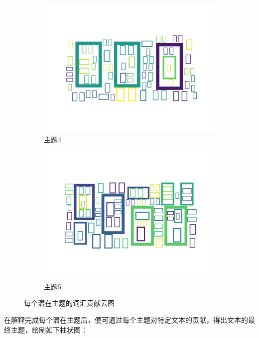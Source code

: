 \documentclass[UTF8,a4paper,15pt,titlepage,oneside]{ctexbook}
\begin{document}
\begin{figure}[htbp]
    \begin{subfigure}{0.32\textwidth}
      \includegraphics[width=\linewidth]{pictures/29.png}
      \caption{主题4}
    \end{subfigure}
    \hspace{0.2cm}
    \begin{subfigure}{0.32\textwidth}
      \includegraphics[width=\linewidth]{pictures/30.png}
      \caption{主题5}
    \end{subfigure}
    
    \caption{每个潜在主题的词汇贡献云图}
    \end{figure}

    在解释完成每个潜在主题后，便可通过每个主题对特定文本的贡献，得出文本的最终主题，绘制如下柱状图：
\end{document}
